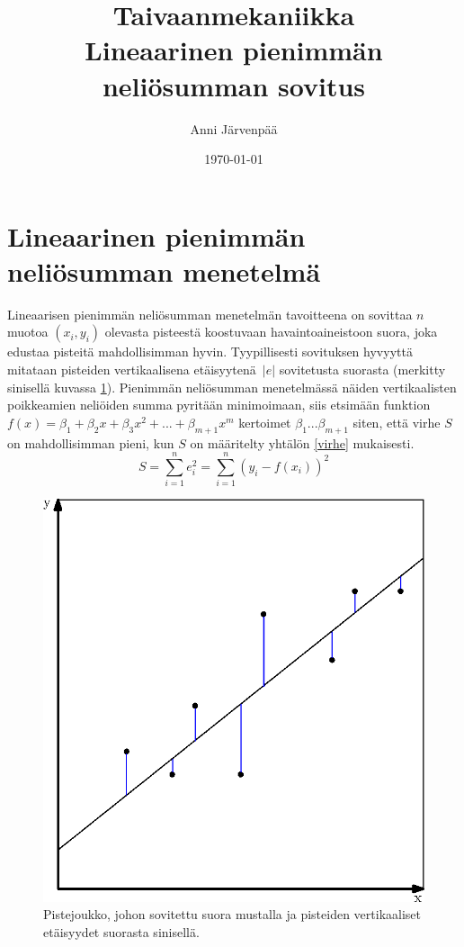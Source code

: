\documentclass[12pt,a4paper,titlepage]{article}
\title{Taivaanmekaniikka \\ Lineaarinen pienimmän neliösumman sovitus \vspace{0.5em}}
\author{\begin{tabular}{c}
Anni Järvenpää
\end{tabular}}
\date{\today}
\begin{document}
\maketitle

\newpage
\null
\thispagestyle{empty}
\addtocounter{page}{-1}
\newpage

\section{Lineaarinen pienimmän neliösumman menetelmä} \label{tavallinenMenetelma}
Lineaarisen pienimmän neliösumman menetelmän tavoitteena on sovittaa $n$ muotoa $(x_i, y_i)$ olevasta pisteestä koostuvaan havaintoaineistoon suora, joka edustaa pisteitä mahdollisimman hyvin. Tyypillisesti sovituksen hyvyyttä mitataan pisteiden vertikaalisena etäi\-syytenä~$|e|$ sovitetusta suorasta (merkitty sinisellä kuvassa \ref{vertikaalietaisyys}). Pienimmän neliösumman menetelmässä näiden vertikaalisten poikkeamien neliöiden summa pyritään minimoimaan, siis etsimään funktion $f(x) = \beta_1 + \beta_2 x + \beta_3 x^2 + ... + \beta_{m+1} x^m$ kertoimet $\beta_1 ... \beta_{m+1}$ siten, että virhe $S$ on mahdollisimman pieni, kun $S$ on määritelty yhtälön \ref{virhe} mukaisesti.~\cite{basicideas}
\begin{equation} \label{virhe}
	S = \sum\limits_{i=1}^{n} e_i^2 = \sum\limits_{i=1}^{n} (y_i - f(x_i))^2
\end{equation}

\begin{figure}
\centering
\includegraphics{vertikaalietaisyys.eps}
\caption{Pistejoukko, johon sovitettu suora mustalla ja pisteiden vertikaaliset etäisyydet suorasta sinisellä.}
\label{vertikaalietaisyys}
\end{figure}
\end{document}
